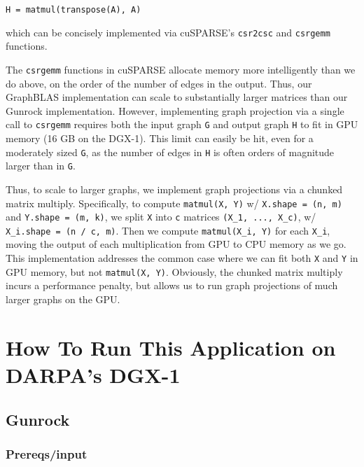 \documentclass[10pt,oneside]{memoir}
\begin{document}
\begin{verbatim}
H = matmul(transpose(A), A)
\end{verbatim}

which can be concisely implemented via cuSPARSE's \texttt{csr2csc} and
\texttt{csrgemm} functions.

The \texttt{csrgemm} functions in cuSPARSE allocate memory more
intelligently than we do above, on the order of the number of edges in
the output. Thus, our GraphBLAS implementation can scale to
substantially larger matrices than our Gunrock implementation. However,
implementing graph projection via a single call to \texttt{csrgemm}
requires both the input graph \texttt{G} and output graph \texttt{H} to
fit in GPU memory (16 GB on the DGX-1). This limit can easily be hit,
even for a moderately sized \texttt{G}, as the number of edges in
\texttt{H} is often orders of magnitude larger than in \texttt{G}.

Thus, to scale to larger graphs, we implement graph projections via a
chunked matrix multiply. Specifically, to compute \texttt{matmul(X,\ Y)}
w/ \texttt{X.shape\ =\ (n,\ m)} and \texttt{Y.shape\ =\ (m,\ k)}, we
split \texttt{X} into \texttt{c} matrices \texttt{(X\_1,\ ...,\ X\_c)},
w/ \texttt{X\_i.shape\ =\ (n\ /\ c,\ m)}. Then we compute
\texttt{matmul(X\_i,\ Y)} for each \texttt{X\_i}, moving the output of
each multiplication from GPU to CPU memory as we go. This implementation
addresses the common case where we can fit both \texttt{X} and
\texttt{Y} in GPU memory, but not \texttt{matmul(X,\ Y)}. Obviously, the
chunked matrix multiply incurs a performance penalty, but allows us to
run graph projections of much larger graphs on the GPU.

\hypertarget{how-to-run-this-application-on-darpas-dgx-1-6}{%
\section{How To Run This Application on DARPA's
DGX-1}\label{how-to-run-this-application-on-darpas-dgx-1-6}}

\hypertarget{gunrock-1}{%
\subsection{Gunrock}\label{gunrock-1}}

\hypertarget{prereqsinput-5}{%
\subsubsection{Prereqs/input}\label{prereqsinput-5}}
\end{document}
